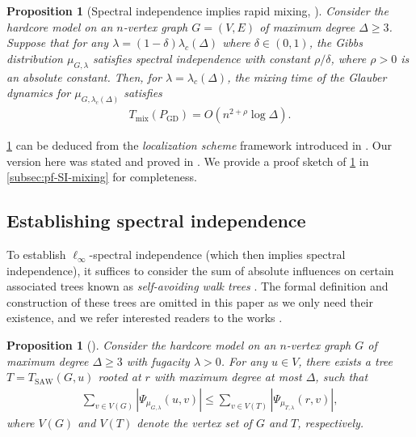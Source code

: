\documentclass[11pt]{article}
\theoremstyle{plain}
\newtheorem{proposition}[theorem]{Proposition}
\theoremstyle{definition}
\theoremstyle{remark}
\begin{document}
\begin{proposition}[Spectral independence implies rapid mixing, \cite{CCYZ24,chen2022localization}]
	\label{prop:SS-mixing-full}
	Consider the hardcore model on an $n$-vertex graph $G=(V,E)$ of maximum degree $\Delta \ge 3$. 
	Suppose that for any $\lambda = (1-\delta)\lambda_c(\Delta)$ where $\delta \in (0,1)$, the Gibbs distribution $\mu_{G,\lambda}$ satisfies spectral independence with constant $\rho/\delta$, where $\rho > 0$ is an absolute constant.
	Then, for $\lambda = \lambda_c(\Delta)$, the mixing time of the Glauber dynamics for $\mu_{G,\lambda_c(\Delta)}$ satisfies
	\begin{align*}
		T_{\mathrm{mix}}(P_{\mathrm{GD}}) = O\left( n^{2+\rho} \log \Delta \right).
	\end{align*}
\end{proposition}

\cref{prop:SS-mixing-full} can be deduced from the \emph{localization scheme} framework introduced in \cite{chen2022localization}. Our version here was stated and proved in \cite{CCYZ24}.
We provide a proof sketch of \cref{prop:SS-mixing-full} in \cref{subsec:pf-SI-mixing} for completeness. 



\subsection{Establishing spectral independence}


To establish $\ell_\infty$-spectral independence (which then implies spectral independence), it suffices to consider the sum of absolute influences on certain associated trees known as \emph{self-avoiding walk trees} \cite{weitz2006counting}. The formal definition and construction of these trees are omitted in this paper as we only need their existence, and we refer interested readers to the works \cite{weitz2006counting,chen2023rapid}.


\begin{proposition}[\cite{chen2023rapid}] \label{prop:SI-graph-tree}
	Consider the hardcore model on an $n$-vertex graph $G$ of maximum degree $\Delta \ge 3$ with fugacity $\lambda > 0$. 
	For any $u \in V$, there exists a tree $T = T_{\mathrm{SAW}}(G,u)$ rooted at $r$ with maximum degree at most $\Delta$, such that 
	\begin{align*}
		\sum_{v \in V(G)} \left| \Psi_{\mu_{G,\lambda}}(u,v) \right|
		\le \sum_{v \in V(T)} \left| \Psi_{\mu_{T,\lambda}}(r,v) \right|,
	\end{align*}
    where $V(G)$ and $V(T)$ denote the vertex set of $G$ and $T$, respectively.
\end{proposition}
\end{document}

